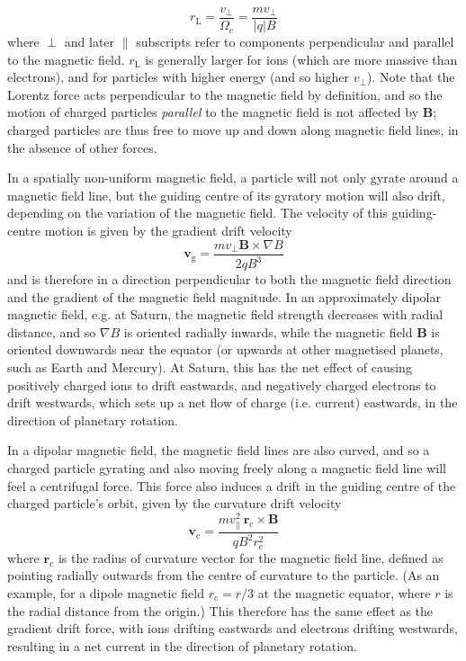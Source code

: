 \begin{equation}
r_\mathrm{L} = \frac{v_\perp}{\Omega_c} = \frac{mv_\perp}{|q|B}
\end{equation}
where $\perp$ and later $\parallel$ subscripts refer to components perpendicular and parallel to the magnetic field. $r_\mathrm{L}$ is generally larger for ions (which are more massive than electrons), and for particles with higher energy (and so higher $v_\perp$). Note that the Lorentz force acts perpendicular to the magnetic field by definition, and so the motion of charged particles \textit{parallel} to the magnetic field is not affected by $\boldsymbol{B}$; charged particles are thus free to move up and down along magnetic field lines, in the absence of other forces.

In a spatially non-uniform magnetic field, a particle will not only gyrate around a magnetic field line, but the guiding centre of its gyratory motion will also drift, depending on the variation of the magnetic field. The velocity of this guiding-centre motion is given by the gradient drift velocity
\begin{equation}
\boldsymbol{v}_\mathrm{g} = \frac{mv_\perp\boldsymbol{B}\times\nabla B}{2qB^3}
\end{equation}
and is therefore in a direction perpendicular to both the magnetic field direction and the gradient of the magnetic field magnitude. In an approximately dipolar magnetic field, e.g. at Saturn, the magnetic field strength decreases with radial distance, and so $\nabla B$ is oriented radially inwards, while the magnetic field $\boldsymbol{B}$ is oriented downwards near the equator (or upwards at other magnetised planets, such as Earth and Mercury). At Saturn, this has the net effect of causing positively charged ions to drift eastwards, and negatively charged electrons to drift westwards, which sets up a net flow of charge (i.e. current) eastwards, in the direction of planetary rotation.

In a dipolar magnetic field, the magnetic field lines are also curved, and so a charged particle gyrating and also moving freely along a magnetic field line will feel a centrifugal force. This force also induces a drift in the guiding centre of the charged particle's orbit, given by the curvature drift velocity
\begin{equation}
\boldsymbol{v}_\mathrm{c} = \frac{mv_\parallel^2~\boldsymbol{r}_\mathrm{c}\times\boldsymbol{B}}{qB^2r_\mathrm{c}^2}
\end{equation}
where $\boldsymbol{r}_\mathrm{c}$ is the radius of curvature vector for the magnetic field line, defined as pointing radially outwards from the centre of curvature to the particle. (As an example, for a dipole magnetic field $r_\mathrm{c}= r/3$ at the magnetic equator, where $r$ is the radial distance from the origin.) This therefore has the same effect as the gradient drift force, with ions drifting eastwards and electrons drifting westwards, resulting in a net current in the direction of planetary rotation. 

